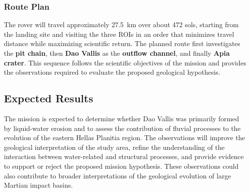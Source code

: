 \subsubsection{Route Plan}
\label{sec:route_plan}
The rover will travel approximately \qty{27.5}{\kilo\meter} over about \num{472} sols, starting from the landing site and visiting the three ROIs in an order that minimizes travel distance while maximizing scientific return. The planned route first investigates the \textbf{pit chain}, then \textbf{Dao Vallis} as the \textbf{outflow channel}, and finally \textbf{Apia crater}. This sequence follows the scientific objectives of the mission and provides the observations required to evaluate the proposed geological hypothesis.

\subsection{Expected Results}
\label{sec:expected_results}
The mission is expected to determine whether Dao Vallis was primarily formed by liquid-water erosion and to assess the contribution of fluvial processes to the evolution of the eastern Hellas Planitia region. The observations will improve the geological interpretation of the study area, refine the understanding of the interaction between water-related and structural processes, and provide evidence to support or reject the proposed mission hypothesis.
These observations could also contribute to broader interpretations of the geological evolution of large Martian impact basins.

